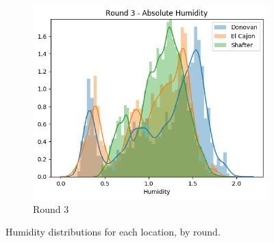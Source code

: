 \documentclass[journal abbreviation, manuscript]{copernicus}
\begin{document}
\begin{figure}[H]
\begin{subfigure}{0.32\textwidth}
\includegraphics[width=\textwidth]{results/distributions/round3_humidity.png}
\caption{Round 3}
\end{subfigure}
\caption{Humidity distributions for each location, by round.}
\label{fig:humidity-rounds}
\end{figure}



\iffalse
\end{document}

